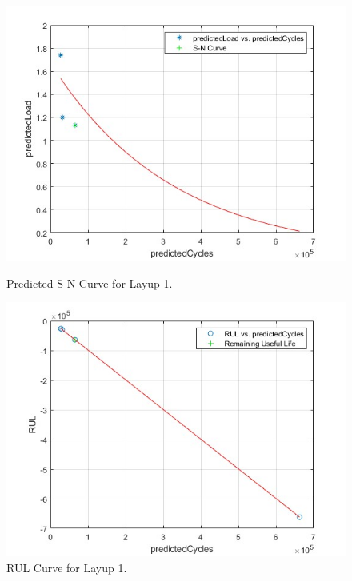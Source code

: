 \begin{figure}[h]
    \centering
    \begin{minipage}{0.45\textwidth}
        \centering
        \includegraphics[width=\linewidth]{s_n_1.jpg}
        \caption{Predicted S-N Curve for Layup 1.}
    \end{minipage}
    \hfill
    \begin{minipage}{0.45\textwidth}
        \centering
        \includegraphics[width=\linewidth]{rul_1.jpg}
        \caption{RUL Curve for Layup 1.}
    \end{minipage}
\end{figure}

